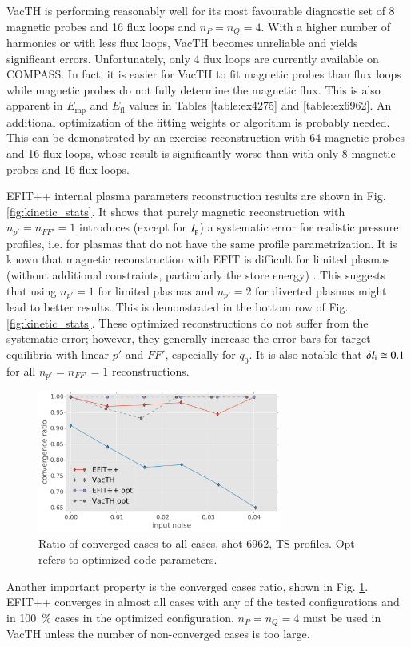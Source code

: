 VacTH is performing reasonably well for its most favourable diagnostic set of 8 magnetic probes and 16 flux loops and $n_P = n_Q = 4$. With a higher number of harmonics or with less flux loops, VacTH becomes unreliable and yields significant errors. Unfortunately, only 4 flux loops are currently available on COMPASS. In fact, it is easier for VacTH to fit magnetic probes than flux loops while magnetic probes do not fully determine the magnetic flux. This is also apparent in $E_\mathrm{mp}$ and $E_\mathrm{fl}$ values in Tables \ref{table:ex4275} and \ref{table:ex6962}. An additional optimization of the fitting weights or algorithm is probably needed. This can be demonstrated by an exercise reconstruction with 64 magnetic probes and 16 flux loops, whose result is significantly worse than with only 8 magnetic probes and 16 flux loops.

EFIT++ internal plasma parameters reconstruction results are shown in Fig. \ref{fig:kinetic_stats}. It shows that purely magnetic reconstruction with $n_{p'}=n_{FF'}=1$ introduces (except for $I_{\rm{p}}$) a systematic error for realistic pressure profiles, i.e. for plasmas that do not have the same profile parametrization. 
It is known that magnetic reconstruction with EFIT is difficult for limited plasmas (without additional constraints, particularly the store energy) \cite{efit1985}.
This suggests that using $n_{p'}=1$ for limited plasmas and $n_{p'}=2$ for diverted plasmas might lead to better results. This is demonstrated in the bottom row of Fig. \ref{fig:kinetic_stats}.
These optimized reconstructions do not suffer from the systematic error; however, they generally increase the error bars for target equilibria with linear $p'$ and $FF'$, especially for $q_0$. It is also notable that $\delta l_{\rm{i}} \cong 0.1$ for all $n_{p'}=n_{FF'}=1$ reconstructions.

\begin{figure}
\centering   %
\hfill{}
\includegraphics[width=8cm]{figures/convergence_ratio_6962.pdf}
\hfill{}
\caption{Ratio of converged cases to all cases, shot 6962, TS profiles. Opt refers to optimized code parameters.}
\label{fig:convergence_ratio}
\end{figure}

Another important property is the converged cases ratio, shown in Fig. \ref{fig:convergence_ratio}. EFIT++ converges in almost all cases with any of the tested configurations and in 100~\% cases in the optimized configuration. $n_P = n_Q = 4$ must be used in VacTH unless the number of non-converged cases is too large.



